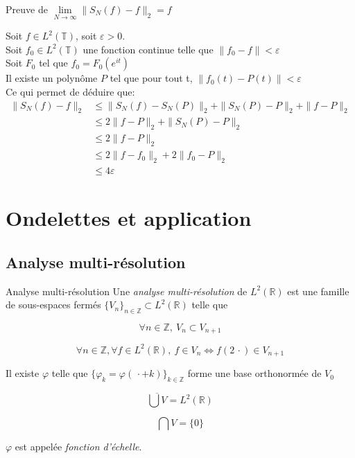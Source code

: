 \documentclass[french]{beamer}
\begin{document}
\begin{frame}{Preuve de $ \lim\limits_{N \to \infty} \| S_N(f) - f \|_2  = f $ }
	
	Soit $f \in L^2(\mathbb{T})$, soit $\varepsilon > 0$.\\
	Soit $f_0 \in L^2(\mathbb{T})$ une fonction continue telle que 
	$ \| f_0 - f \| < \varepsilon $\\
	\pause
	Soit $F_0$ tel que $f_0 = F_0(e^{it})$\\ 
	Il existe un polynôme $P$ tel que pour tout t, $\|f_0(t) - P(t)\| < \varepsilon$\\
	Ce qui permet de déduire que: \\
	\pause
	\begin{align*}
	\| S_N(f) -f \|_2 &\leqslant \|S_N(f) - S_N(P)\|_2 + \| S_N(P) - P \|_2 + \| f- P \|_2 \\
	&	\leqslant 2 \| f - P\|_2 + \| S_N(P) - P\|_2 \ \\
	& \leqslant 2 \| f - P\|_2  \\
	& \leqslant 2 \| f - f_0\|_2 + 2 \| f_0- P\|_2 \\
	& \leqslant 4 \varepsilon
	\end{align*}
	
	
\end{frame}






\section{Ondelettes et application}

\subsection{Analyse multi-résolution}

\begin{frame}{Analyse multi-résolution}
	Une \textit{analyse multi-résolution} de $L^2(\mathbb{R})$ est une famille de sous-espaces fermés $\{V_n\}_{n \in \mathbb{Z}} \subset L^2(\mathbb{R})$ telle que
	
	\pause
	$$\forall n \in \mathbb{Z}, ~ V_{n} \subset V_{n+1}$$

	\pause
	$$\forall n \in \mathbb{Z}, \forall f \in L^2(\mathbb{R}), ~ f \in V_n \Longleftrightarrow f (2 \, \cdot ) \in V_{n+1}$$
	
	\pause
	Il existe $\varphi$ telle que $\{\varphi_k = \varphi(\, \cdot + k)\}_{k \in \mathbb{Z}}$ forme une base orthonormée de $V_0$

	\pause
	$$\overline{\bigcup V} = L^2(\mathbb{R})$$
	
	\pause
	$$\bigcap V = \{0\}$$

	\pause			
	$\varphi$ est appelée \textit{fonction d'échelle}.
\end{frame}
\end{document}
